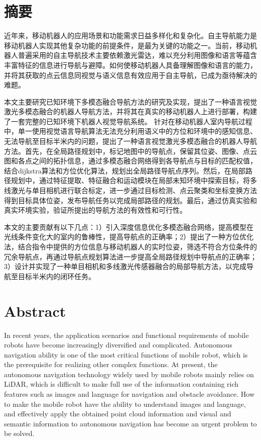 \chapter{摘\texorpdfstring{\quad}{}要}
    近年来，移动机器人的应用场景和功能需求日益多样化和复杂化。自主导航能力是移动机器人实现其他复杂功能的前提条件，是最为关键的功能之一。当前，移动机器人普遍采用的自主导航技术主要依赖激光雷达，难以充分利用图像和语言等蕴含丰富特征的信息进行导航与避障。如何使移动机器人具备理解图像和语言的能力，并将其获取的点云信息同视觉与语义信息有效应用于自主导航，已成为亟待解决的难题。
    
    本文主要研究已知环境下多模态融合导航方法的研究及实现，提出了一种语言视觉激光多模态融合的机器人导航方法，并将其在真实的移动机器人上进行部署，构建了一套完整的已知环境下机器人视觉导航系统。
    针对在移动机器人室内导航过程中，单一使用视觉语言导航算法无法充分利用语义中的方位和环境中的感知信息、无法导航至目标半米内的问题，提出了一种语言视觉激光多模态融合的机器人导航方法。首先，在全局路径规划中，标记地图中的导航点，保留其位姿、图像、点云图和各点之间的拓扑信息，通过多模态融合网络得到各导航点与目标的匹配权值，结合dijkstra算法和方位优化算法，规划出全局路径导航点序列。然后，在局部路径规划中，通过特征提取、特征融合和运动模块在局部未知环境中探索目标，将多线激光与单目相机进行联合标定，进一步通过目标检测、点云聚类和坐标变换方法得到目标具体位姿，发布导航任务以完成局部路径的规划。最后，通过仿真实验和真实环境实验，验证所提出的导航方法的有效性和可行性。
    
    本文的主要贡献有以下几点：1）引入深度信息优化多模态融合网络，提高模型在光线条件变化大的室内的鲁棒性，提高导航点的正确率；2）提出了一种方位优化法，结合指令中提供的方位信息与移动机器人的实时位姿，筛选不符合方位条件的冗余导航点，再通过导航点规划算法进一步提高全局路径规划中导航点的正确率；3）设计并实现了一种单目相机和多线激光传感器融合的局部导航方法，以完成导航至目标半米内的闭环任务。


\chapter{Abstract}
    In recent years, the application scenarios and functional requirements of mobile robots have become increasingly diversified and complicated. Autonomous navigation ability is one of the most critical functions of mobile robot, which is the prerequisite for realizing other complex functions. At present, the autonomous navigation technology widely used by mobile robots mainly relies on LiDAR, which is difficult to make full use of the information containing rich features such as images and language for navigation and obstacle avoidance. How to make the mobile robot have the ability to understand images and language, and effectively apply the obtained point cloud information and visual and semantic information to autonomous navigation has become an urgent problem to be solved.

